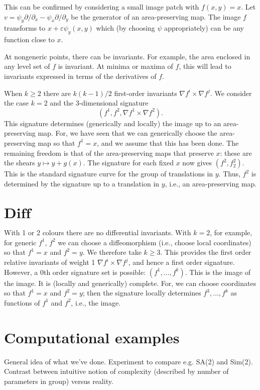 \documentclass{article}
\begin{document}
This can be confirmed by considering a small image patch with $f(x,y)=x.$ Let $v=\psi_y\partial/\partial_x
- \psi_x\partial/\partial_y$ be the generator of an area-preserving map. The image
$f$ transforms to $x + \varepsilon \psi_y(x,y)$ which (by choosing $\psi$ appropriately) can
be any function close to $x$.

At nongeneric points, there can be invariants. For example, the area enclosed in any level
set of $f$ is invariant. At minima or maxima of $f$, this will lead to invariants expressed in terms of the derivatives of $f$.


When $k\ge 2$ there are $k(k-1)/2$ first-order invariants $ \nabla f^i \times \nabla f^j$. 
We consider the case $k=2$ and the 3-dimensional signature
$$ (f^1,f^2, \nabla f^1 \times \nabla f^2).$$
This signature determines (generically and locally) the image up to an area-preserving map.
For, we have seen that we can generically choose the area-preserving map so that $f^1=x$, and
we assume that this has been done. The remaining freedom is that of the area-preserving
maps that preserve $x$: these are the shears $y\mapsto y + g(x)$. The signature for each fixed $x$ now gives $(f^2,f^2_2)$. This is the standard signature curve for the group of translations in $y$.
Thus, $f^2$ is determined by the signature up to a translation in $y$, i.e., an area-preserving map.


\section{{\bf $\mathbf{Diff}$}}

With 1 or 2 colours there are no differential invariants. With $k=2$, for example, for generic $f^1$, $f^2$ we
can choose a diffeomorphism (i.e., choose local coordinates) so that $f^1=x$ and $f^2=y$.
We therefore take $k\ge 3$. This provides the first order relative invariants of weight 1 $\nabla f^i\times \nabla f^j$,
and hence a first order signature. However, a 0th order signature set is possible: $(f^1,\dots,f^k)$. This is
the image of the image. It is (locally and generically) complete. For, we can choose
coordinates so that $f^1=x$ and $f^2=y$; then the signature locally determines $f^3,\dots,f^k$ as
functions of $f^1$ and $f^2$, i.e., the image.





\section{Computational examples}
General idea of what we've done. Experiment to compare e.g. SA(2) and
Sim(2). Contrast between intuitive notion of complexity (described by
number of parameters in group) versus reality.
\end{document}
